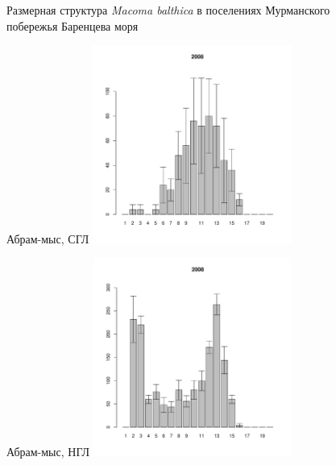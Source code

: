 \begin{figure}[hp]
\begin{minipage}[b]{.46\linewidth}
\begin{center}
	\end{center}
	\end{minipage}
\caption{Размерная структура {\it Macoma balthica} в поселениях Мурманского побережья Баренцева моря}
\label{ris:Barents_sizestr}
\end{figure}


	\begin{figure}[hp]
	
	\begin{minipage}[b]{.46\linewidth}
	\begin{center}
	{\tiny Абрам-мыс, СГЛ}
		\includegraphics[width=65mm]{../Barenc_Sea/Abram-mys/middle_2008_.pdf}
	\end{center}
	\end{minipage}
	\hfil %
	\begin{minipage}[b]{.46\linewidth}
	\begin{center}
	{\tiny Абрам-мыс, НГЛ}
		\includegraphics[width=65mm]{../Barenc_Sea/Abram-mys/low_2008_.pdf}
	\end{center}
	\end{minipage}
	\begin{minipage}[b]{.46\linewidth}

\end{minipage}
\end{figure}
